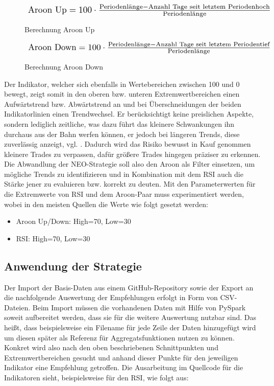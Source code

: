 \begin{figure}
\begin{equation*}
\resizebox{\columnwidth}{!}{
$\text{Aroon Up}=100\cdot\frac{\text{Periodenlänge}- \text{Anzahl Tage seit letztem Periodenhoch}}{\text{Periodenlänge}}$}
\end{equation*}
\caption{Berechnung Aroon Up}
\end{figure}

\begin{figure}
\begin{equation*}
\resizebox{\columnwidth}{!}{
$\text{Aroon Down}=100\cdot\frac{\text{Periodenlänge}- \text{Anzahl Tage seit letztem Periodentief}}{\text{Periodenlänge}}$}
\end{equation*}
\caption{Berechnung Aroon Down}
\end{figure}

Der Indikator, welcher sich ebenfalls in Wertebereichen zwischen 100 und 0 bewegt, zeigt somit in den oberen bzw. unteren Extremwertbereichen einen Aufwärtstrend bzw. Abwärtstrend an und bei Überschneidungen der beiden Indikatorlinien einen Trendwechsel. Er berücksichtigt keine preislichen Aspekte, sondern lediglich zeitliche, was dazu führt das kleinere Schwankungen ihn durchaus aus der Bahn werfen können, er jedoch bei längeren Trends, diese zuverlässig anzeigt, vgl. \cite{aro20}. Dadurch wird das Risiko bewusst in Kauf genommen kleinere Trades zu verpassen, dafür größere Trades hingegen präziser zu erkennen. Die Abwandlung der NEO-Strategie soll also den Aroon als Filter einsetzen, um mögliche Trends zu identifizieren und in Kombination mit dem RSI auch die Stärke jener zu evaluieren bzw. korrekt zu deuten. Mit den Parameterwerten für die Extremwerte von RSI und dem Aroon-Paar muss experimentiert werden, wobei in den meisten Quellen die Werte wie folgt gesetzt werden: \\

\begin{itemize}
	\item Aroon Up/Down: High=70, Low=30
	\item RSI: High=70, Low=30
\end{itemize}

\subsection{Anwendung der Strategie}

Der Import der Basis-Daten aus einem GitHub-Repository sowie der Export an die nachfolgende Auswertung der Empfehlungen erfolgt in Form von CSV-Dateien. Beim Import müssen die vorhandenen Daten mit Hilfe von PySpark soweit aufbereitet werden, dass sie für die weitere Auswertung nutzbar sind. Das heißt, dass beispielsweise ein Filename für jede Zeile der Daten hinzugefügt wird um diesen später als Referenz für Aggregatsfunktionen nutzen zu können. Konkret wird also nach den oben beschriebenen Schnittpunkten und Extremwertbereichen gesucht und anhand dieser Punkte für den jeweiligen Indikator eine Empfehlung getroffen. Die Ausarbeitung im Quellcode für die Indikatoren sieht, beispielsweise für den RSI, wie folgt aus: \\

